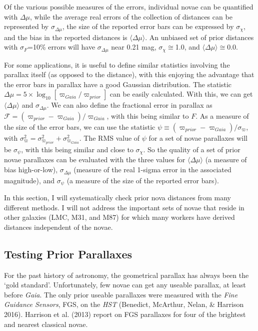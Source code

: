 \documentclass[a4paper,fleqn,usenatbib]{mnras}
\begin{document}
Of the various possible measures of the errors, individual novae can be quantified with $\Delta \mu$, while the average real errors of the collection of distances can be represented by $\sigma_{\Delta \mu}$, the size of the reported error bars can be expressed by $\sigma_{\chi}$, and the bias in the reported distances is $\langle \Delta \mu \rangle$.  An unbiased set of prior distances with $\sigma_F$=10\% errors will have $\sigma_{\Delta \mu}$ near 0.21 mag, $\sigma_{\chi}$$\cong$1.0, and $\langle \Delta \mu \rangle$$\cong$0.0.

For some applications, it is useful to define similar statistics involving the parallax itself (as opposed to the distance), with this enjoying the advantage that the error bars in parallax have a good Gaussian distribution.  The statistic $\Delta \mu = 5\times \log_{10}[\varpi_{Gaia}/\varpi_{prior}]$ can be easily calculated.  With this, we can get $\langle \Delta \mu \rangle$ and $\sigma_{\Delta \mu}$.  We can also define the fractional error in parallax as $\mathcal{F}=(\varpi_{prior}-\varpi_{Gaia})/\varpi_{Gaia}$, with this being similar to $F$.  As a measure of the size of the error bars, we can use the statistic $\psi \equiv (\varpi_{prior}-\varpi_{Gaia})/\sigma_{\varpi}$, with $\sigma_{\varpi}^2=\sigma^2_{\varpi_{prior}} + \sigma^2_{\varpi_{Gaia}}$.  The RMS value of $\psi$ for a set of novae parallaxes will be $\sigma_{\psi}$, with this being similar and close to $\sigma_{\chi}$.  So the quality of a set of prior novae parallaxes can be evaluated with the three values for $\langle \Delta \mu \rangle$ (a measure of bias high-or-low), $\sigma_{\Delta \mu}$ (measure of the real 1-sigma error in the associated magnitude), and $\sigma_{\psi}$ (a measure of the size of the reported error bars).

In this section, I will systematically check prior nova distances from many different methods.  I will not address the important sets of novae that reside in other galaxies (LMC, M31, and M87) for which many workers have derived distances independent of the novae.

\subsection{Testing Prior Parallaxes}

For the past history of astronomy, the geometrical parallax has always been the `gold standard'.  Unfortunately, few novae can get any useable parallax, at least before {\it Gaia}.  The only prior useable parallaxes were measured with the {\it Fine Guidance Sensors}, FGS, on the {\it HST} (Benedict, McArthur, Nelan, \& Harrison 2016).  Harrison et al. (2013) report on FGS parallaxes for four of the brightest and nearest classical novae.  
\end{document}
